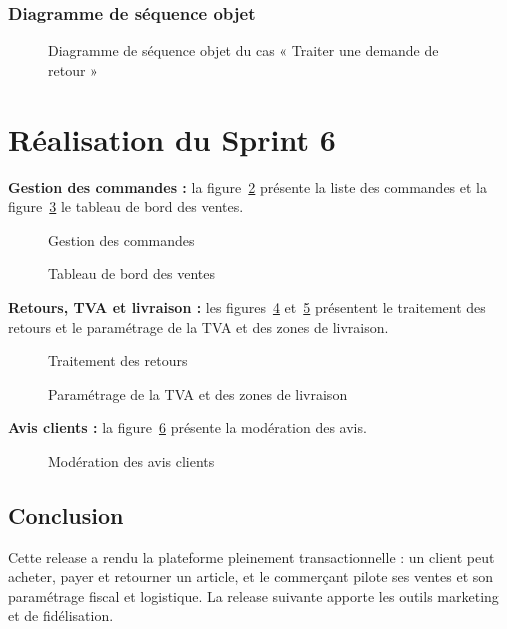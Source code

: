 \subsubsection{Diagramme de séquence objet}
\begin{figure}[H]
    \centering
    \caption{Diagramme de séquence objet du cas « Traiter une demande de retour »}
    \label{fig:dso-retour}
\end{figure}

\section{Réalisation du Sprint 6}
\textbf{Gestion des commandes :} la figure~\ref{fig:ui-commandes} présente la liste des commandes et la figure~\ref{fig:ui-dashboard} le tableau de bord des ventes.
\begin{figure}[H]
    \centering
    \caption{Gestion des commandes}
    \label{fig:ui-commandes}
\end{figure}
\begin{figure}[H]
    \centering
    \caption{Tableau de bord des ventes}
    \label{fig:ui-dashboard}
\end{figure}

\textbf{Retours, TVA et livraison :} les figures~\ref{fig:ui-retours} et~\ref{fig:ui-tva} présentent le traitement des retours et le paramétrage de la TVA et des zones de livraison.
\begin{figure}[H]
    \centering
    \caption{Traitement des retours}
    \label{fig:ui-retours}
\end{figure}
\begin{figure}[H]
    \centering
    \caption{Paramétrage de la TVA et des zones de livraison}
    \label{fig:ui-tva}
\end{figure}

\textbf{Avis clients :} la figure~\ref{fig:ui-avis} présente la modération des avis.
\begin{figure}[H]
    \centering
    \caption{Modération des avis clients}
    \label{fig:ui-avis}
\end{figure}

\subsection*{Conclusion}
Cette release a rendu la plateforme pleinement transactionnelle : un client peut acheter, payer et retourner un article, et le commerçant pilote ses ventes et son paramétrage fiscal et logistique. La release suivante apporte les outils marketing et de fidélisation.
